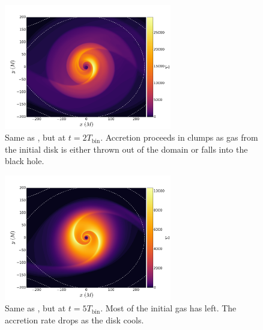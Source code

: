 \begin{figure}
\begin{center}
\includegraphics[width=0.65\textwidth]{figures/minidisk/q011_m3_sig_0200.pdf}
\end{center}
\caption{ Same as , but at $t = 2 T_\text{bin}$.  Accretion proceeds in clumps as gas from the initial disk is either thrown out of the domain or falls into the black hole.}
\end{figure}

\begin{figure}
\begin{center}
\includegraphics[width=0.65\textwidth]{figures/minidisk/q011_m3_sig_0500.pdf}
\end{center}
\caption{ Same as , but at $t = 5 T_\text{bin}$.  Most of the initial gas has left. The accretion rate drops as the disk cools.}
\end{figure}

